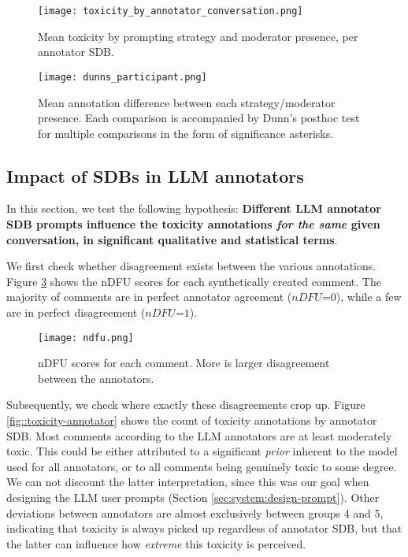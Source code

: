 \begin{figure}
	\centering
	\texttt{[image: toxicity\_by\_annotator\_conversation.png]}
	\caption{Mean toxicity by prompting strategy and moderator presence, per annotator \ac{SDB}.}
	\label{fig::toxicity-strategy}
\end{figure}

\begin{figure}
	\centering
	\texttt{[image: dunns\_participant.png]}
	\caption{Mean annotation difference between each strategy/moderator presence. Each comparison is accompanied by Dunn's posthoc test for multiple comparisons in the form of significance asterisks.}
	\label{fig::toxicity-strategy-significance}
\end{figure}



\subsection{Impact of SDBs in LLM annotators}
\label{ssec:evaluation:annotators}

In this section, we test the following hypothesis: \textbf{Different LLM annotator \ac{SDB} prompts influence the toxicity annotations \textit{for the same} given conversation, in significant qualitative and statistical terms}. 

We first check whether disagreement exists between the various annotations. Figure \ref{fig::toxicity-ndfu} shows the  \ac{nDFU}\cite{pavlopoulos-likas-2024-polarized} scores for each synthetically created comment. The majority of comments are in perfect annotator agreement ($nDFU\text{=}0$), while a few are in perfect disagreement ($nDFU\text{=}1$).

\begin{figure}
	\centering
	\texttt{[image: ndfu.png]}
	\caption{\ac{nDFU} \cite{pavlopoulos-likas-2024-polarized} scores for each comment. More is larger disagreement between the annotators.}
	\label{fig::toxicity-ndfu}
\end{figure}

Subsequently, we check where exactly these disagreements crop up. Figure \ref{fig::toxicity-annotator} shows the count of toxicity annotations by annotator \ac{SDB}. Most comments according to the LLM annotators are at least moderately toxic. This could be either attributed to a significant \textit{prior} inherent to the model used for all annotators, or to all comments being genuinely toxic to some degree. We can not discount the latter interpretation, since this was our goal when designing the LLM user prompts (Section \ref{sec:system:design-prompt}). Other deviations between annotators are almost exclusively between groups 4 and 5, indicating that toxicity is always picked up regardless of annotator \ac{SDB}, but that the latter can influence how \textit{extreme} this toxicity is perceived.

